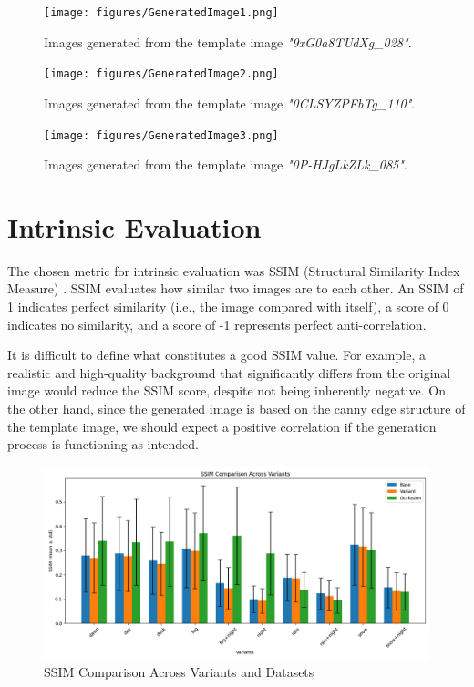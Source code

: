 \begin{figure}[htbp]
\centering
\texttt{[image: figures/GeneratedImage1.png]}
  \caption{Images generated from the template image \emph{"9xG0a8TUdXg\_028"}.}
\end{figure}

\begin{figure}[htbp]
\centering
\texttt{[image: figures/GeneratedImage2.png]}
  \caption{Images generated from the template image \emph{"0CLSYZPFbTg\_110"}.}
\end{figure}

\begin{figure}[htbp]
\centering
\texttt{[image: figures/GeneratedImage3.png]}
  \caption{Images generated from the template image \emph{"0P-HJgLkZLk\_085"}.}
\end{figure}

\FloatBarrier
\section{Intrinsic Evaluation}

The chosen metric for intrinsic evaluation was SSIM (Structural Similarity Index Measure) \cite{wang_image_2004}. 
SSIM evaluates how similar two images are to each other. 
An SSIM of 1 indicates perfect similarity (i.e., the image compared with itself), a score of 0 indicates no similarity, and a score of -1 represents perfect anti-correlation.

It is difficult to define what constitutes a good SSIM value. 
For example, a realistic and high-quality background that significantly differs from the original image would reduce the SSIM score, despite not being inherently negative. 
On the other hand, since the generated image is based on the canny edge structure of the template image, we should expect a positive correlation if the generation process is functioning as intended.

\begin{figure}[htbp]
\hspace*{-2.5cm} %
\includegraphics[width=1.5\textwidth]{figures/SSIM.png}
  \caption{SSIM Comparison Across Variants and Datasets}
\end{figure}


